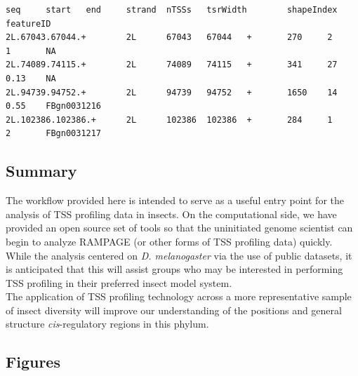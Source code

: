 \documentclass[runningheads,a4paper]{llncs}
\begin{document}
\begin{linenumbers}
\noindent
\begin{verbatim}
seq     start   end     strand  nTSSs   tsrWidth        shapeIndex      featureID
2L.67043.67044.+        2L      67043   67044   +       270     2       1       NA
2L.74089.74115.+        2L      74089   74115   +       341     27      0.13    NA
2L.94739.94752.+        2L      94739   94752   +       1650    14      0.55    FBgn0031216
2L.102386.102386.+      2L      102386  102386  +       284     1       2       FBgn0031217
\end{verbatim}

\subsection{Summary}
The workflow provided here is intended to serve as a useful entry point for the analysis of TSS profiling data in insects. 
On the computational side, we have provided an open source set of tools so that the uninitiated genome scientist can begin to analyze RAMPAGE (or other forms of TSS profiling data) quickly.
While the analysis centered on \textit{D. melanogaster} via the use of public datasets, it is anticipated that this will assist groups who may be interested in performing TSS profiling in their preferred insect model system.\\
The application of TSS profiling technology across a more representative sample of insect diversity will improve our understanding of the positions and general structure \textit{cis}-regulatory regions in this phylum.

\subsection{Figures}


\end{linenumbers}
\end{document}
